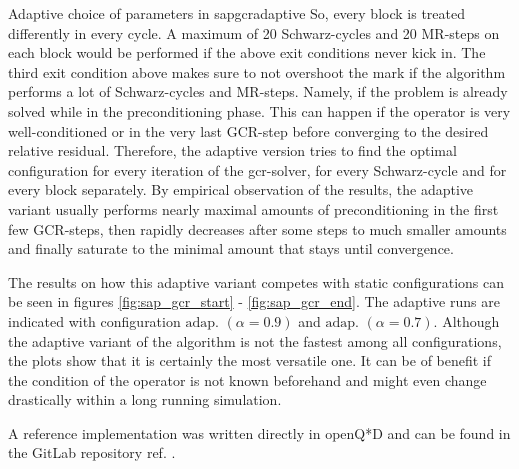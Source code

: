 \documentclass{article}
\theoremstyle{plain} %
\theoremstyle{convention} %
\theoremstyle{remark} %
\numberwithin{equation}{section}
\begin{document}
\begin{proposal}{Adaptive choice of parameters in \acrshort{sapgcr}}{adaptive}
So, every block is treated differently in every cycle. A maximum of \num{20} Schwarz-cycles and \num{20} MR-steps on each block would be performed if the above exit conditions never kick in. The third exit condition above makes sure to not overshoot the mark if the algorithm performs a lot of Schwarz-cycles and MR-steps. Namely, if the problem is already solved while in the preconditioning phase. This can happen if the operator is very well-conditioned or in the very last GCR-step before converging to the desired relative residual. Therefore, the adaptive version tries to find the optimal configuration for every iteration of the \acrshort{gcr}-solver, for every Schwarz-cycle and for every block separately. By empirical observation of the results, the adaptive variant usually performs nearly maximal amounts of preconditioning in the first few GCR-steps, then rapidly decreases after some steps to much smaller amounts and finally saturate to the minimal amount that stays until convergence.

The results on how this adaptive variant competes with static configurations can be seen in figures \ref{fig:sap_gcr_start} - \ref{fig:sap_gcr_end}. The adaptive runs are indicated with configuration $\text{adap. }(\alpha=0.9)$ and $\text{adap. }(\alpha=0.7)$. Although the adaptive variant of the algorithm is not the fastest among all configurations, the plots show that it is certainly the most versatile one. It can be of benefit if the condition of the operator is not known beforehand and might even change drastically within a long running simulation.

A reference implementation was written directly in openQ*D and can be found in the GitLab repository ref. \cite{gitlab_adaptive}.

\end{proposal}

\end{document}
